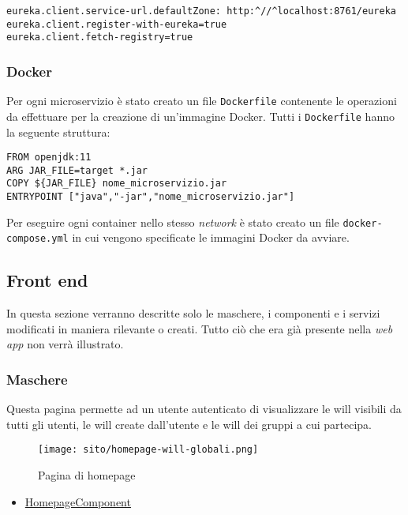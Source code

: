 \begin{lstlisting}[style=Docker, caption = {Configurazione per la registrazione di un microservizio all'\texttt{Eureka Server} nel file \texttt{application.properties}}]
eureka.client.service-url.defaultZone: http:^//^localhost:8761/eureka
eureka.client.register-with-eureka=true
eureka.client.fetch-registry=true
\end{lstlisting}

\subsubsection{Docker}
Per ogni \gls{microservizio} è stato creato un file \texttt{Dockerfile}
contenente le operazioni da effettuare per la creazione di un'immagine Docker.
Tutti i \texttt{Dockerfile} hanno la seguente struttura:

\begin{lstlisting}[style=Docker]
FROM openjdk:11
ARG JAR_FILE=target *.jar
COPY ${JAR_FILE} nome_microservizio.jar
ENTRYPOINT ["java","-jar","nome_microservizio.jar"]
\end{lstlisting}

Per eseguire ogni \gls{container} nello stesso \textit{network} è stato creato
un file \texttt{docker-compose.yml} in cui vengono specificate le immagini
Docker da avviare.
\subsection{Front end}
In questa sezione verranno descritte solo le maschere, i componenti e i servizi
modificati in maniera rilevante o creati. Tutto ciò che era già presente nella
\textit{web app} non verrà illustrato.
\subsubsection{Maschere}
Questa pagina permette ad un utente autenticato di visualizzare le \gls{will}
visibili da tutti gli utenti, le \gls{will} create dall'utente e le \gls{will}
dei gruppi a cui partecipa.
\begin{figure}[H]
    \centering
    \texttt{[image: sito/homepage-will-globali.png]}
    \caption{Pagina di homepage}
\end{figure}
\begin{itemize}
    \item \hyperref[par:HomepageComponent]{HomepageComponent}
\end{itemize}

